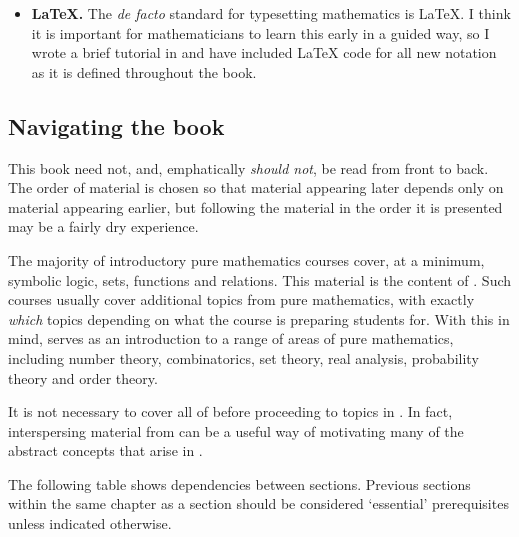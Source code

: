 \begin{itemize}
\item \textbf{\LaTeX{}.} The \textit{de facto} standard for typesetting mathematics is \LaTeX{}. I think it is important for mathematicians to learn this early in a guided way, so I wrote a brief tutorial in  and have included \LaTeX{} code for all new notation as it is defined throughout the book.

\end{itemize}



\subsection*{Navigating the book}

This book need not, and, emphatically \textit{should not}, be read from front to back. The order of material is chosen so that material appearing later depends only on material appearing earlier, but following the material in the order it is presented may be a fairly dry experience.

The majority of introductory pure mathematics courses cover, at a minimum, symbolic logic, sets, functions and relations. This material is the content of . Such courses usually cover additional topics from pure mathematics, with exactly \textit{which} topics depending on what the course is preparing students for. With this in mind,  serves as an introduction to a range of areas of pure mathematics, including number theory, combinatorics, set theory, real analysis, probability theory and order theory.

It is not necessary to cover all of  before proceeding to topics in . In fact, interspersing material from  can be a useful way of motivating many of the abstract concepts that arise in .

The following table shows dependencies between sections. Previous sections within the same chapter as a section should be considered `essential' prerequisites unless indicated otherwise.

